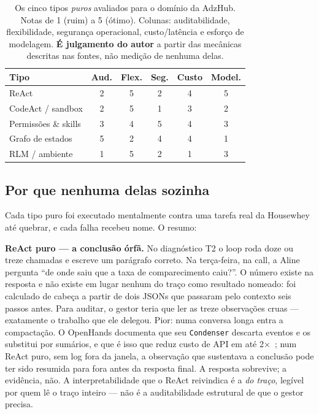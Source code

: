 \documentclass[10pt,twocolumn]{article}
\newcommand{\code}[1]{\texttt{\footnotesize #1}}
\begin{document}
\begin{table}[t]
\centering
\footnotesize
\scriptsize
\caption{Os cinco tipos \emph{puros} avaliados para o domínio da AdzHub. Notas de 1 (ruim)
a 5 (ótimo). Colunas: auditabilidade, flexibilidade, segurança operacional, custo/latência
e esforço de modelagem. \textbf{É julgamento do autor} a partir das mecânicas descritas nas
fontes, não medição de nenhuma delas.}
\label{tab:tipos}
\setlength{\tabcolsep}{4pt}
\begin{tabular}{@{}lccccc@{}}
\toprule
Tipo & Aud. & Flex. & Seg. & Custo & Model. \\
\midrule
ReAct                  & 2 & 5 & 2 & 4 & 5 \\
CodeAct / sandbox      & 2 & 5 & 1 & 3 & 2 \\
Permissões \& skills   & 3 & 4 & 5 & 4 & 3 \\
Grafo de estados       & 5 & 2 & 4 & 4 & 1 \\
RLM / ambiente         & 1 & 5 & 2 & 1 & 3 \\
\bottomrule
\end{tabular}
\end{table}

\subsection{Por que nenhuma delas sozinha}

Cada tipo puro foi executado mentalmente contra uma tarefa real da Housewhey até quebrar, e
cada falha recebeu nome. O resumo:

\textbf{ReAct puro --- a conclusão órfã.} No diagnóstico T2 o loop roda doze ou treze
chamadas e escreve um parágrafo correto. Na terça-feira, na call, a Aline pergunta ``de onde
saiu que a taxa de comparecimento caiu?''. O número existe na resposta e não existe em lugar
nenhum do traço como resultado nomeado: foi calculado de cabeça a partir de dois JSONs que
passaram pelo contexto seis passos antes. Para auditar, o gestor teria que ler as treze
observações cruas --- exatamente o trabalho que ele delegou. Pior: numa conversa longa entra
a compactação. O OpenHands documenta que seu \code{Condenser} descarta eventos e os
substitui por sumários, e que é isso que reduz custo de API em até
2$\times$~\cite{wang2026openhands}; num ReAct puro, sem log fora da janela, a observação que
sustentava a conclusão pode ter sido resumida para fora antes da resposta final. A resposta
sobrevive; a evidência, não. A interpretabilidade que o ReAct reivindica é a \emph{do
traço}, legível por quem lê o traço inteiro --- não é a auditabilidade estrutural de que o
gestor precisa.
\end{document}
